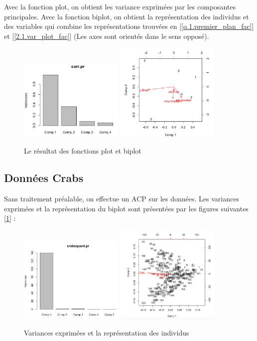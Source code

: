 \documentclass{article}
\begin{document}
Avec la fonction plot, on obtient les variance exprimées par les composantes principales.
Avec la fonction biplot, on obtient la représentation des individus et des variables qui combine les représentations trouvées en [\ref{q.1.premier_plan_fac}] et [\ref{2.1.var_plot_fac}] (Les axes sont orientés dans le sens opposé).

\begin{figure}[H]
\centering
\includegraphics[width=5cm]{./img/princomp_1.png}
\includegraphics[width=5cm]{./img/princomp_2.png}
\caption{Le résultat des fonctions plot et biplot}
\end{figure}



\subsection{Données Crabs}
Sans traitement préalable, on effectue un ACP sur les données. Les variances exprimées et la représentation du biplot sont présentées par les figures suivantes [\ref{2.3.var_acp}] :

\begin{figure}[H]
\centering
\includegraphics[width=5cm]{./img/acp_crabs_variance.png}
\includegraphics[width=5cm]{./img/acp_crabs_biplot.png}
\caption{Variances exprimées et la représentation des individus}
\label{2.3.var_acp}
\end{figure}
\end{document}
